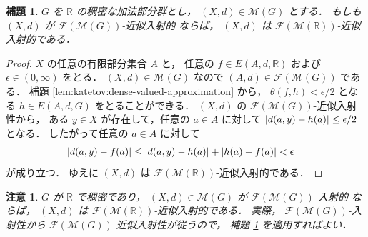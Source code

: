 \documentclass[leqno, 12pt]{jsarticle}
\newtheorem{lem}[thm]{補題}
\newtheorem*{rmk}{注意}
\newcommand{\rr}{\mathbb{R}}
\DeclarePairedDelimiter{\abs}{\lvert}{\rvert}
\newcommand{\Met}[1]{\mathscr{M}(#1)}
\newcommand{\FinitePart}[1]{\mathscr{F}(#1)}
\newcommand{\FinMet}[1]{\FinitePart{\Met{#1}}}
\newcommand{\Espace}[3]{E(#1,#2,#3)}
\newcommand{\KatDist}{\theta}
\begin{document}
\begin{lem}\label{lem:katetov:dense-approx-to-real-approx}
$G$
を
$\rr$
の稠密な加法部分群とし，
$(X,d)\in\Met{G}$
とする．
もしも
$(X,d)$
が
$\FinMet{G}$-近似入射的
ならば，
$(X,d)$
は
$\FinMet{\rr}$-近似入射的である．
\end{lem}
\begin{proof}
$X$
の任意の有限部分集合
$A$
と，
任意の
$f\in\Espace{A}{d}{\rr}$
および
$\epsilon\in(0,\infty)$
をとる．
$(X,d)\in\Met{G}$
なので
$(A,d)\in\FinMet{G}$
である．
補題
\ref{lem:katetov:dense-valued-approximation}
から，
$\KatDist(f,h)<\epsilon/2$
となる
$h\in\Espace{A}{d}{G}$
をとることができる．
$(X,d)$
の
$\FinMet{G}$-近似入射性から，
ある
$y\in X$
が存在して，任意の
$a\in A$
に対して
$\abs{d(a,y)-h(a)}\le\epsilon/2$
となる．
したがって任意の
$a\in A$
に対して
\begin{align*}
\abs{d(a,y)-f(a)}
&\le\abs{d(a,y)-h(a)}+\abs{h(a)-f(a)}<\epsilon
\end{align*}
が成り立つ．
ゆえに
$(X,d)$
は
$\FinMet{\rr}$-近似入射的である．
\end{proof}


\begin{rmk}\label{rmk:katetov:dense-injective}
$G$
が
$\rr$
で稠密であり，
$(X,d)\in\Met{G}$
が
$\FinMet{G}$-入射的
ならば，
$(X,d)$
は
$\FinMet{\rr}$-近似入射的である．
実際，
$\FinMet{G}$-入射性から
$\FinMet{G}$-近似入射性が従うので，
補題
\ref{lem:katetov:dense-approx-to-real-approx}
を適用すればよい．
\end{rmk}
\end{document}
